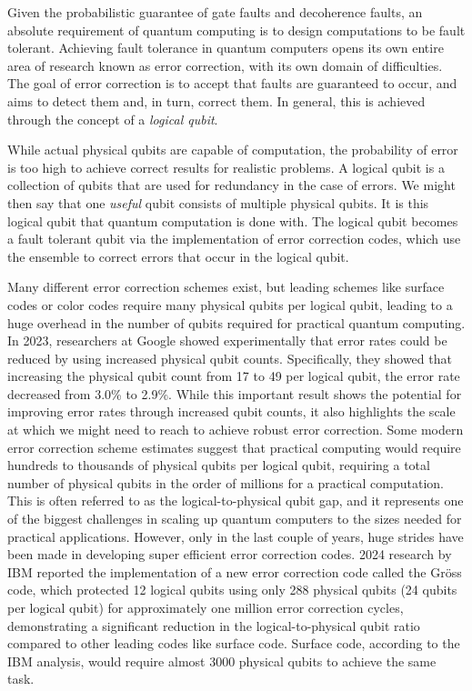 \documentclass{elbioimp2}
\begin{document}
Given the probabilistic guarantee of gate faults and decoherence faults, an absolute requirement of quantum computing is to design computations to be fault tolerant. Achieving fault tolerance in quantum computers opens its own entire area of research known as error correction, with its own domain of difficulties. The goal of error correction is to accept that faults are guaranteed to occur, and aims to detect them and, in turn, correct them. In general, this is achieved through the concept of a \textit{logical qubit}.

While actual physical qubits are capable of computation, the probability of error is too high to achieve correct results for realistic problems. A logical qubit is a collection of qubits that are used for redundancy in the case of errors. We might then say that one \textit{useful} qubit consists of multiple physical qubits. It is this logical qubit that quantum computation is done with. The logical qubit becomes a fault tolerant qubit via the implementation of error correction codes, which use the ensemble to correct errors that occur in the logical qubit.

Many different error correction schemes exist, but leading schemes like surface codes or color codes require many physical qubits per logical qubit, leading to a huge overhead in the number of qubits required for practical quantum computing. In 2023, researchers at Google showed experimentally that error rates could be reduced by using increased physical qubit counts\cite{GoogleQAI2023}. Specifically, they showed that increasing the physical qubit count from 17 to 49 per logical qubit, the error rate decreased from 3.0\% to 2.9\%. While this important result shows the potential for improving error rates through increased qubit counts, it also highlights the scale at which we might need to reach to achieve robust error correction. Some modern error correction scheme estimates suggest that practical computing would require hundreds to thousands of physical qubits per logical qubit, requiring a total number of physical qubits in the order of millions for a practical computation. This is often referred to as the logical-to-physical qubit gap, and it represents one of the biggest challenges in scaling up quantum computers to the sizes needed for practical applications. However, only in the last couple of years, huge strides have been made in developing super efficient error correction codes. 2024 research by IBM reported the implementation of a new error correction code called the Gr\"oss code, which protected 12 logical qubits using only 288 physical qubits (24 qubits per logical qubit) for approximately one million error correction cycles, demonstrating a significant reduction in the logical-to-physical qubit ratio\cite{FTQM2024} compared to other leading codes like surface code. Surface code, according to the IBM analysis, would require almost 3000 physical qubits to achieve the same task.
\end{document}
